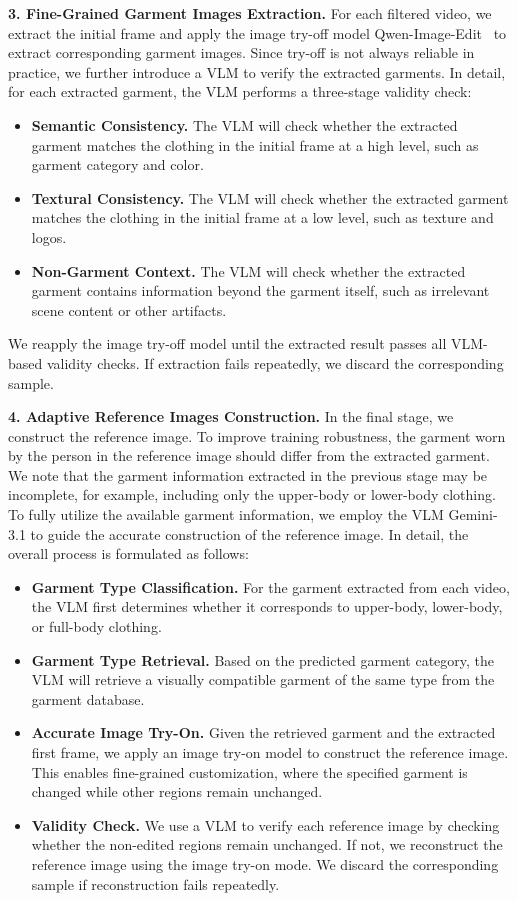 \documentclass{llmxive}
\begin{document}
\noindent
\textbf{3. Fine-Grained Garment Images Extraction.}
% 
For each filtered video, we extract the initial frame and apply the image try-off model Qwen-Image-Edit~\cite{wu2025qwen} to extract corresponding garment images.
Since try-off is not always reliable in practice, we further introduce a VLM to verify the extracted garments.
In detail, for each extracted garment, the VLM performs a three-stage validity check:
% 
\begin{itemize}
% 
\item \textbf{Semantic Consistency.} The VLM will check whether the extracted garment matches the clothing in the initial frame at a high level, such as garment category and color.
% 
\item \textbf{Textural Consistency.} The VLM will check whether the extracted garment matches the clothing in the initial frame at a low level, such as texture and logos.
% 
\item \textbf{Non-Garment Context.} The VLM will check whether the extracted garment contains information beyond the garment itself, such as irrelevant scene content or other artifacts.
\end{itemize}
% 
We reapply the image try-off model until the extracted result passes all VLM-based validity checks. If extraction fails repeatedly, we discard the corresponding sample.

\noindent
\textbf{4. Adaptive Reference Images Construction.}
% 
In the final stage, we construct the reference image. To improve training robustness, the garment worn by the person in the reference image should differ from the extracted garment.
% 
We note that the garment information extracted in the previous stage may be incomplete, for example, including only the upper-body or lower-body clothing.
To fully utilize the available garment information, we employ the VLM Gemini-3.1 to guide the accurate construction of the reference image. In detail, the overall process is formulated as follows:
\begin{itemize}
% 
\item \textbf{Garment Type Classification.} For the garment extracted from each video, the VLM first determines whether it corresponds to upper-body, lower-body, or full-body clothing.
% 
\item \textbf{Garment Type Retrieval.} Based on the predicted garment category, the VLM will retrieve a visually compatible garment of the same type from the garment database.
% 
\item \textbf{Accurate Image Try-On.} Given the retrieved garment and the extracted first frame, we apply an image try-on model to construct the reference image. This enables fine-grained customization, where the specified garment is changed while other regions remain unchanged.
% 
\item \textbf{Validity Check.} We use a VLM to verify each reference image by checking whether the non-edited regions remain unchanged. If not, we reconstruct the reference image using the image try-on mode. We discard the corresponding sample if reconstruction fails repeatedly.
\end{itemize}
\end{document}
